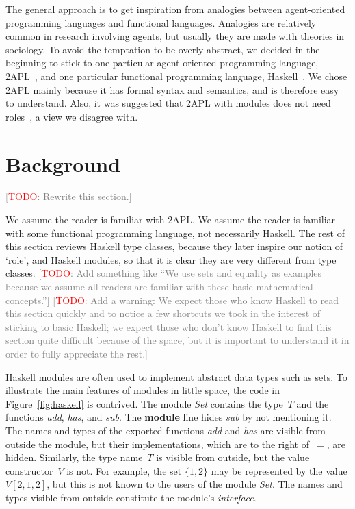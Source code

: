 \documentclass[conference,compsoc]{IEEEtran} %
\newcommand{\todo}[1]{{\small \textcolor{gray}{[\textcolor{red}{TODO}: #1]}}}
\begin{document}
The general approach is to get inspiration from analogies between
agent-oriented programming languages and functional languages. Analogies
are relatively common in research involving agents, but usually they are
made with theories in sociology. To avoid the temptation to be overly
abstract, we decided in the beginning to stick to one particular
agent-oriented programming language,
2APL~\cite{DBLP:journals/aamas/Dastani08}, and one particular functional
programming language, Haskell~\cite{web:haskell}. We chose 2APL mainly
because it has formal syntax and semantics, and is therefore easy to
understand. Also, it was suggested that 2APL with modules does not need
roles~\cite{dblp:conf/prima/dastanims08}, a view we disagree with.

\section{Background} %

\todo{Rewrite this section.}

We assume the reader is familiar with 2APL. We assume the reader is
familiar with some functional programming language, not necessarily Haskell.
The rest of this section reviews Haskell type classes, because they later
inspire our notion of `role', and Haskell modules, so that it is clear they
are very different from type classes. \todo{Add something like ``We use
sets and equality as examples because we assume all readers are familiar
with these basic mathematical concepts.''} \todo{Add a warning: We expect
those who know Haskell to read this section quickly and to notice a few
shortcuts we took in the interest of sticking to basic Haskell; we expect
those who don't know Haskell to find this section quite difficult because
of the space, but it is important to understand it in order to fully
appreciate the rest.}


Haskell modules are often used to implement abstract data types such as
sets.  To illustrate the main features of modules in little space, the code
in Figure~\ref{fig:haskell} is contrived.  The module \textit{Set} contains
the type~$T$ and the functions \textit{add}, \textit{has}, and
\textit{sub}. The \textbf{module} line hides \textit{sub} by not mentioning
it. The names and types of the exported functions \textit{add} and
\textit{has} are visible from outside the module, but their
implementations, which are to the right of~$=$, are hidden.  Similarly, the
type name~$T$ is visible from outside, but the value constructor~$V$ is
not. For example, the set $\{1,2\}$ may be represented by the value
$V[2,1,2]$, but this is not known to the users of the module \textit{Set}.
The names and types visible from outside constitute the module's
\emph{interface}.
\end{document}
